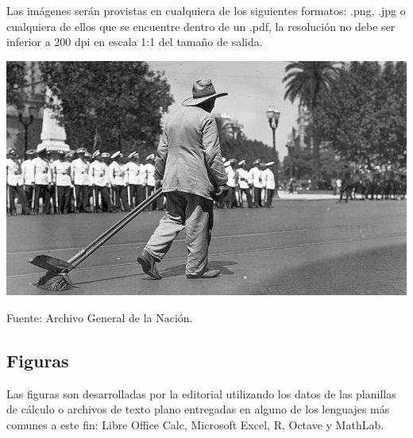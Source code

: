 \documentclass{book}
\begin{document}
{{{{Las imágenes serán provistas en cualquiera de los siguientes formatos: {\ttfamily .png}, {\ttfamily .jpg} o cualquiera de ellos que se encuentre dentro de un {\ttfamily .pdf}, la resolución no debe ser inferior a 200 dpi en escala 1:1 del tamaño de salida.

\begin{imagen}
\includegraphics[width=\textwidth]{barrendero.jpg}
\caption{Fuente: Archivo General de la Nación.}
\end{imagen}

\subsection{Figuras}

Las figuras son desarrolladas por la editorial utilizando los datos de las planillas de cálculo o archivos de texto plano entregadas en alguno de los lenguajes más comunes a este fin: Libre Office Calc, Microsoft Excel, R, Octave y MathLab.

}}}}
\end{document}
